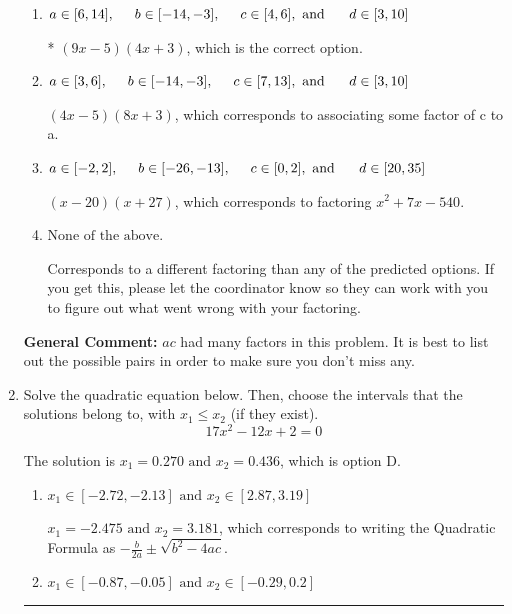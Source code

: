 \documentclass{extbook}[14pt]
\newcommand{\litem}[1]{\item #1

\rule{\textwidth}{0.4pt}}
\begin{document}
\begin{enumerate}
{\begin{enumerate}[label=\Alph*.]
 $(27x -5)(x + 3)$, which corresponds to associating some factor of a to c.
\item \( a \in [6, 14], \hspace*{5mm} b \in [-14, -3], \hspace*{5mm} c \in [4, 6], \text{ and } \hspace*{5mm} d \in [3, 10] \)

* $(9x -5)(4x + 3)$, which is the correct option.
\item \( a \in [3, 6], \hspace*{5mm} b \in [-14, -3], \hspace*{5mm} c \in [7, 13], \text{ and } \hspace*{5mm} d \in [3, 10] \)

 $(4x -5)(8x + 3)$, which corresponds to associating some factor of c to a.
\item \( a \in [-2, 2], \hspace*{5mm} b \in [-26, -13], \hspace*{5mm} c \in [0, 2], \text{ and } \hspace*{5mm} d \in [20, 35] \)

 $(x -20)(x + 27)$, which corresponds to factoring $x^{2} +7 x -540$.
\item \( \text{None of the above.} \)

 Corresponds to a different factoring than any of the predicted options. If you get this, please let the coordinator know so they can work with you to figure out what went wrong with your factoring.
\end{enumerate}

\textbf{General Comment:} $ac$ had many factors in this problem. It is best to list out the possible pairs in order to make sure you don't miss any.
}
\litem{
Solve the quadratic equation below. Then, choose the intervals that the solutions belong to, with $x_1 \leq x_2$ (if they exist).
\[ 17x^{2} -12 x + 2 = 0 \]

The solution is \( x_1 = 0.270 \text{ and } x_2 = 0.436 \), which is option D.\begin{enumerate}[label=\Alph*.]
\item \( x_1 \in [-2.72, -2.13] \text{ and } x_2 \in [2.87, 3.19] \)

 $x_1 = -2.475 \text{ and } x_2 = 3.181$, which corresponds to writing the Quadratic Formula as $-\frac{b}{2a} \pm \sqrt{b^2 - 4ac}$.
\item \( x_1 \in [-0.87, -0.05] \text{ and } x_2 \in [-0.29, 0.2] \)


\end{enumerate}}
\end{enumerate}
\end{document}
